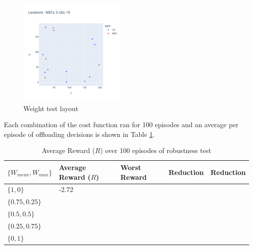 \begin{figure}[H]
  \centering
  \includegraphics[width=200px]{images/5_10_layout.png}
  \caption{Weight test layout}  \label{weight_test}
\end{figure}

Each combination of the cost function ran for 100 episodes and an average per episode of offloading decisions is shown in Table \ref{weight_table}.

\begin{table}[H]
\centering
\begin{tabular}{|l|l|l|l|l|}
\hline
$\{W_{mean}, W_{max}\}$        & Average Reward ($R$) & Worst Reward & Reduction & Reduction\\ \hline
$\{1, 0\}$       & -2.72 &  & &\\
$\{0.75, 0.25\}$  &  &  & &\\
$\{0.5, 0.5\}$ &  &  & &\\ 
$\{0.25, 0.75\}$ &  &  & & \\ 
$\{0, 1\}$ &  &  & & \\ \hline
\end{tabular}
\caption{Average Reward ($R$) over 100 episodes of robustness test} \label{weight_table}
\end{table}